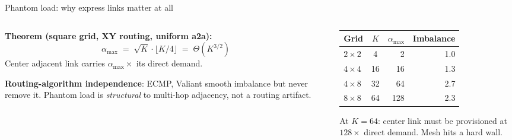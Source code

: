 \documentclass[aspectratio=169]{beamer}
\begin{document}
\begin{frame}{Phantom load: why express links matter at all}
\begin{columns}[T]
\begin{column}{0.55\textwidth}
\textbf{Theorem (square grid, XY routing, uniform a2a):}
\[
\alpha_{\max} \;=\; \sqrt{K}\cdot\lfloor K/4 \rfloor \;=\; \Theta(K^{3/2})
\]
Center adjacent link carries $\alpha_{\max}\times$ its direct demand.
\medskip

\textbf{Routing-algorithm independence}:
ECMP, Valiant smooth imbalance but never remove it.
Phantom load is \emph{structural} to multi-hop adjacency, not a routing artifact.
\end{column}
\begin{column}{0.45\textwidth}
\centering
\scriptsize
\begin{tabular}{lcrr}
\toprule
Grid & $K$ & $\alpha_{\max}$ & Imbalance \\
\midrule
$2{\times}2$ & 4   & 2   & 1.0 \\
$4{\times}4$ & 16  & 16  & 1.3 \\
$4{\times}8$ & 32  & 64  & 2.7 \\
$8{\times}8$ & 64  & 128 & 2.3 \\
\bottomrule
\end{tabular}

\vspace{0.6em}
\footnotesize
At $K{=}64$: center link must be provisioned at $128\times$
direct demand. Mesh hits a hard wall.
\end{column}
\end{columns}
\end{frame}
\end{document}
